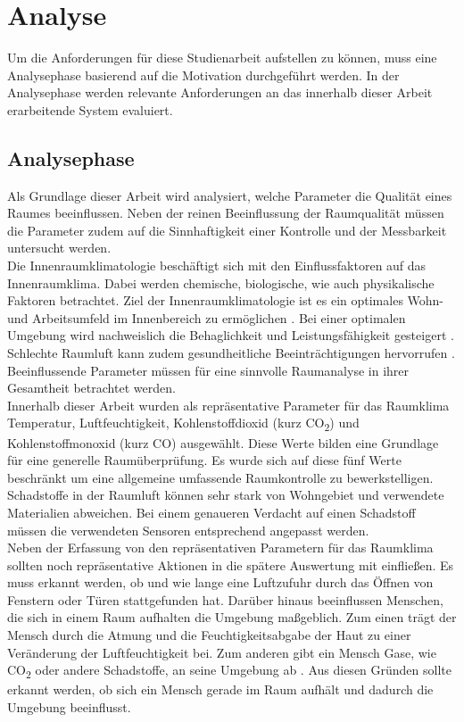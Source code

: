\chapter{Analyse} 
Um die Anforderungen für diese Studienarbeit aufstellen zu können, muss eine Analysephase basierend auf die Motivation durchgeführt werden. In der Analysephase werden relevante Anforderungen an das innerhalb dieser Arbeit erarbeitende System evaluiert.
\section{Analysephase} \label{sec:Anforderungen}
Als Grundlage dieser Arbeit wird analysiert, welche Parameter die Qualität eines Raumes beeinflussen. Neben der reinen Beeinflussung der Raumqualität müssen die Parameter zudem auf die Sinnhaftigkeit einer Kontrolle und der Messbarkeit untersucht werden.\\
Die Innenraumklimatologie beschäftigt sich mit den Einflussfaktoren auf das Innenraumklima. Dabei werden chemische, biologische, wie auch physikalische Faktoren betrachtet. Ziel der Innenraumklimatologie ist es ein optimales Wohn- und Arbeitsumfeld im Innenbereich zu ermöglichen \cite{raumluft:Innenraumklimatologie}. Bei einer optimalen Umgebung wird nachweislich die Behaglichkeit und Leistungsfähigkeit gesteigert \cite{Raumklimatechnik}. Schlechte Raumluft kann zudem gesundheitliche Beeinträchtigungen hervorrufen \cite{raumluft:InnenluftqualitaetundGesundheit}. Beeinflussende Parameter müssen für eine sinnvolle Raumanalyse in ihrer Gesamtheit betrachtet werden.\\
Innerhalb dieser Arbeit wurden als repräsentative Parameter für das Raumklima Temperatur, Luftfeuchtigkeit, Kohlenstoffdioxid (kurz CO\textsubscript{2}) und Kohlenstoffmonoxid (kurz CO) ausgewählt. Diese Werte bilden eine Grundlage für eine generelle Raumüberprüfung. Es wurde sich auf diese fünf Werte beschränkt um eine allgemeine umfassende Raumkontrolle zu bewerkstelligen. Schadstoffe in der Raumluft können sehr stark von Wohngebiet und verwendete Materialien abweichen. Bei einem genaueren Verdacht auf einen Schadstoff müssen die verwendeten Sensoren entsprechend angepasst werden.\\
Neben der Erfassung von den repräsentativen Parametern für das Raumklima sollten noch repräsentative Aktionen in die spätere Auswertung mit einfließen. Es muss erkannt werden, ob und wie lange eine Luftzufuhr durch das Öffnen von Fenstern oder Türen stattgefunden hat. Darüber hinaus beeinflussen Menschen, die sich in einem Raum aufhalten die Umgebung maßgeblich. Zum einen trägt der Mensch durch die Atmung und die Feuchtigkeitsabgabe der Haut zu einer Veränderung der Luftfeuchtigkeit bei. Zum anderen gibt ein Mensch Gase, wie CO\textsubscript{2} oder andere Schadstoffe, an seine Umgebung ab \cite{raumluft:Luftmengen}. Aus diesen Gründen sollte erkannt werden, ob sich ein Mensch gerade im Raum aufhält und dadurch die Umgebung beeinflusst.\\
